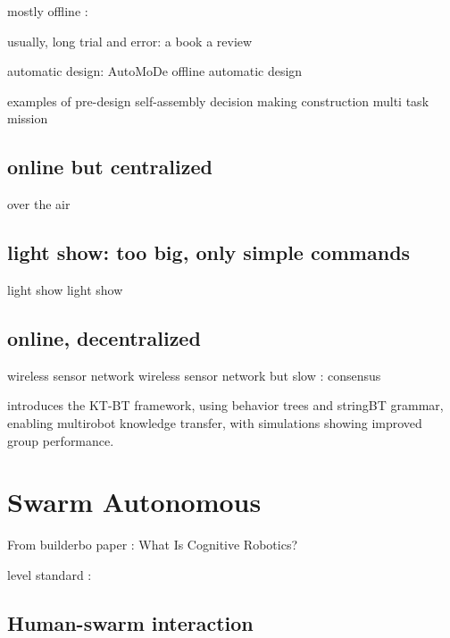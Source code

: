 mostly offline :

usually, long trial and error: 
\cite{hamann2018swarm} a book
\cite{brambilla2013swarm} a review

automatic design:
\cite{francesca2014automode} AutoMoDe
\cite{francesca2016automatic}
\cite{birattari2019automatic} offline automatic design

examples of pre-design
\cite{rubenstein2014programmable} self-assembly
\cite{valentini2016collective} decision making
\cite{werfel2014designing} construction
\cite{dorigo2013swarmanoid} multi task mission

\subsection {online but centralized}
\cite{zyrianoff2024over} over the air
\cite{abadie2024robotap}

\subsection {light show: too big, only simple commands}
\cite{waibel2017drone} light show
\cite{ang2018high} light show

\subsection {online, decentralized}
\cite{xie2011design} wireless sensor network
\cite{wang2006reprogramming} wireless sensor network
but slow : consensus
\cite{de2009energy}
\cite{varadharajan2018over} 



\cite{venkata2023kt} introduces the KT-BT framework, using behavior trees and stringBT grammar, enabling multirobot knowledge transfer, with simulations showing improved group performance.


\section{Swarm Autonomous}

From builderbo paper :
What Is Cognitive Robotics?
\cite{cangelosi2022cognition} 
\cite{vernon2014artificial} 
\cite{heinrich2022swarm}
\cite{khaluf2019neglected}

level standard :
\cite{sae2021automated}


\subsection{Human-swarm interaction}


